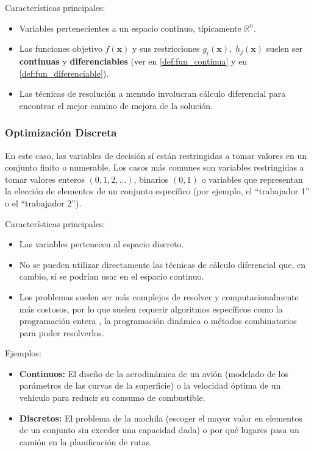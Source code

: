 \documentclass[12pt,a4paper]{book}
\begin{document}
Características principales:
\begin{itemize}
    \item Variables pertenecientes a un espacio continuo, típicamente $\mathbb{R}^n$.
    \item Las funciones objetivo $f(\mathbf{x})$ y sus restricciones $g_i(\mathbf{x}), \;h_j(\mathbf{x})$ suelen ser \textbf{continuas} y \textbf{diferenciables} (ver en \ref{def:fun_continua} y en \ref{def:fun_diferenciable}).
    \item Las técnicas de resolución a menudo involucran cálculo diferencial para encontrar el mejor camino de mejora de la solución.
\end{itemize}

\subsubsection{Optimización Discreta}
En este caso, las variables de decisión sí están restringidas a tomar valores en un conjunto finito o numerable. Los casos más comunes son variables restringidas a tomar valores enteros $(0,1,2,...)$, binarios $(0,1)$ o variables que representan la elección de elementos de un conjunto específico (por ejemplo, el ``trabajador 1'' o el ``trabajador 2'').

Características principales:
\begin{itemize}
    \item Las variables pertenecen al espacio discreto.
    \item No se pueden utilizar directamente las técnicas de cálculo diferencial que, en cambio, sí se podrían usar en el espacio continuo.
    \item Los problemas suelen ser más complejos de resolver y computacionalmente más costosos, por lo que suelen requerir algoritmos específicos como la programación entera \citep{int_programing}, la programación dinámica o métodos combinatorios para poder resolverlos.
\end{itemize}

Ejemplos:
\begin{itemize}
    \item \textbf{Continuos:} El diseño de la aerodinámica de un avión (modelado de los parámetros de las curvas de la superficie) o la velocidad óptima de un vehículo para reducir su consumo de combustible.
    \item \textbf{Discretos:} El problema de la mochila (escoger el mayor valor en elementos de un conjunto sin exceder una capacidad dada) o por qué lugares pasa un camión en la planificación de rutas.
\end{itemize}
\end{document}

